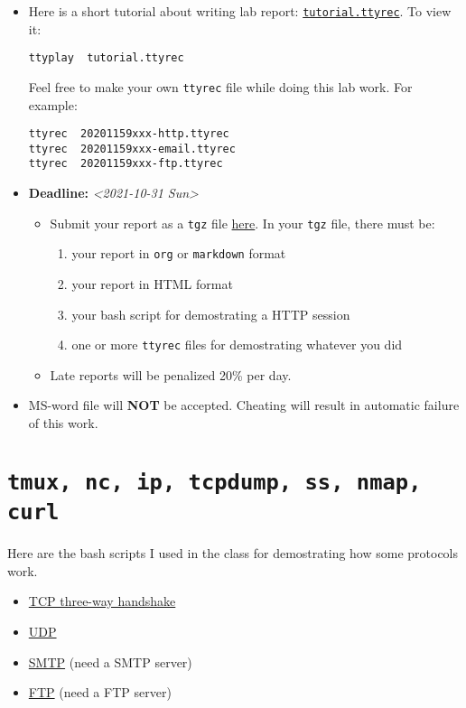 \documentclass{article} [NO-DEFAULT-PACKAGES] \usepackage{wx672hyperref}
\begin{document}
\begin{itemize}
\item Here is a short tutorial about writing lab report: \href{tutorial.ttyrec}{\texttt{tutorial.ttyrec}}. To view it:

\begin{verbatim}
ttyplay  tutorial.ttyrec
\end{verbatim}


Feel free to make your own \texttt{ttyrec} file while doing this lab work. For example:

\begin{verbatim}
ttyrec  20201159xxx-http.ttyrec
ttyrec  20201159xxx-email.ttyrec
ttyrec  20201159xxx-ftp.ttyrec
\end{verbatim}

\item \textbf{Deadline:} \textit{<2021-10-31 Sun> } 

\begin{itemize}
\item Submit your report as a \texttt{tgz} file \href{https://cs6.swfu.edu.cn/moodle/mod/assign/view.php?id=536}{here}. In your \texttt{tgz} file, there must be:
\begin{enumerate}
\item your report in \texttt{org} or \texttt{markdown} format
\item your report in HTML format
\item your bash script for demostrating a HTTP session
\item one or more \texttt{ttyrec} files for demostrating whatever you did
\end{enumerate}

\item Late reports will be penalized 20\% per day.
\end{itemize}

\item MS-word file will \textbf{NOT} be accepted. Cheating will result in automatic failure of this
work.
\end{itemize}

\section{\texttt{tmux, nc, ip, tcpdump, ss, nmap, curl}}
\label{sec:orga451444}

Here are the bash scripts I used in the class for demostrating how some protocols work.

\begin{itemize}
\item \href{https://cs6.swfu.edu.cn/\~wx672/lecture\_notes/network\_basics/scripts/tmux-demo-3way.handshake.sh}{TCP three-way handshake}
\item \href{https://cs6.swfu.edu.cn/\~wx672/lecture\_notes/network\_basics/scripts/tmux-demo-udp.sh}{UDP}
\item \href{https://cs6.swfu.edu.cn/\~wx672/lecture\_notes/network\_basics/scripts/tmux-demo-smtp.sh}{SMTP} (need a SMTP server)
\item \href{https://cs6.swfu.edu.cn/\~wx672/lecture\_notes/network\_basics/scripts/tmux-demo-ftp.sh}{FTP} (need a FTP server)
\end{itemize}
\end{document}
